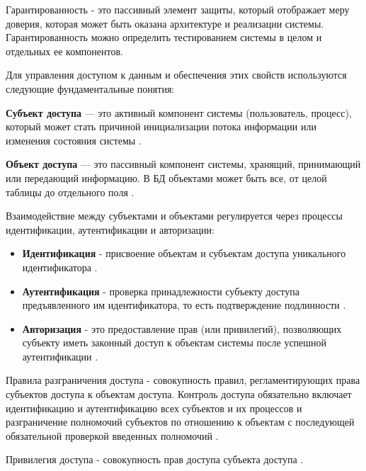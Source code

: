 Гарантированность - это пассивный элемент защиты, который отображает меру доверия, которая может быть оказана архитектуре и реализации системы. Гарантированность можно определить тестированием системы в целом и отдельных ее компонентов.

Для управления доступом к данным и обеспечения этих свойств используются следующие фундаментальные понятия:

\textbf{Субъект доступа} — это активный компонент системы (пользователь, процесс), который может стать причиной инициализации потока информации или изменения состояния системы \autocite[сс. 15-18]{Skakun}. 

\textbf{Объект доступа} — это пассивный компонент системы, хранящий, принимающий или передающий информацию. В БД объектами может быть все, от целой таблицы до отдельного поля \autocite[сс. 15-18]{Skakun}.

Взаимодействие между субъектами и объектами регулируется через процессы идентификации, аутентификации и авторизации:
\begin{itemize}
    \item \textbf{Идентификация} - присвоение объектам и субъектам доступа уникального идентификатора \autocite[сс. 15-18]{Skakun}.
    \item \textbf{Аутентификация}  - проверка принадлежности субъекту доступа предъявленного им идентификатора, то есть подтверждение подлинности \autocite[сс. 15-18]{Skakun}.
    \item \textbf{Авторизация} - это предоставление прав (или привилегий), позволяющих субъекту иметь законный доступ к объектам системы после успешной аутентификации \autocite[сс. 15-18]{Skakun}.
\end{itemize}

Правила разграничения доступа - совокупность правил, регламентирующих права субъектов доступа к объектам доступа. Контроль доступа обязательно включает идентификацию и аутентификацию всех субъектов и их процессов и разграничение полномочий субъектов по отношению к объектам с последующей обязательной проверкой введенных полномочий \autocite[сс. 15-18]{Skakun}.

Привилегия доступа - совокупность прав доступа субъекта доступа \autocite[сс. 15-18]{Skakun}. 

